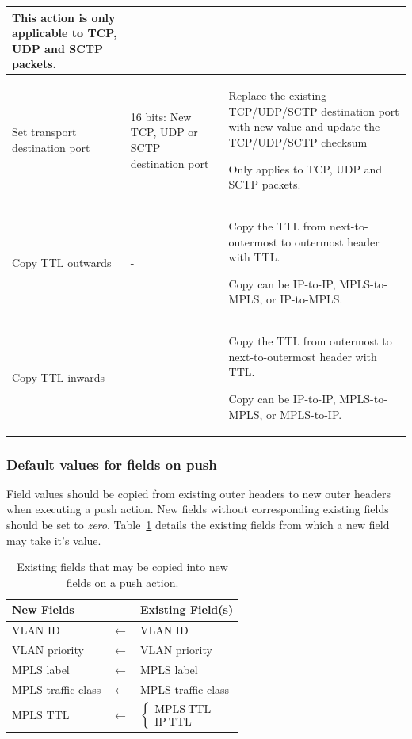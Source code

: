 \documentclass[10pt]{article}
\begin{document}
\begin{xtabular}{ |p{\atactionwidth}|p{\atassocwidth}|p{\atdescwidth}| }
This action is only applicable to TCP, UDP and SCTP packets.\\
\hline
Set transport destination port &
16 bits: New TCP, UDP or SCTP destination port &
Replace the existing TCP/UDP/SCTP destination port with new value and update the TCP/UDP/SCTP checksum

Only applies to TCP, UDP and SCTP packets.\\
\hline
Copy TTL outwards&
- &
Copy the TTL from next-to-outermost to outermost header with TTL.

Copy can be IP-to-IP, MPLS-to-MPLS, or IP-to-MPLS.
\\
\hline
Copy TTL inwards&
- &
Copy the TTL from outermost to next-to-outermost header with TTL.

Copy can be IP-to-IP, MPLS-to-MPLS, or MPLS-to-IP.
\\
\end{xtabular}

\subsubsection{Default values for fields on push}
\label{sec:push field defaults}
Field values should be copied from existing outer headers to new outer headers when executing a push action. New fields without corresponding existing fields should be set to \emph{zero}. Table~\ref{table:push field copy} details the existing fields from which a new field may take it's value.

\begin{table}[hbp]
\centering
\begin{tabular}{lcl}
\textbf{New Fields} & & \textbf{Existing Field(s)} \\
\hline
VLAN ID & $\leftarrow$ & VLAN ID \\
VLAN priority & $\leftarrow$ & VLAN priority \\
MPLS label & $\leftarrow$ & MPLS label \\
MPLS traffic class & $\leftarrow$ & MPLS traffic class \\
MPLS TTL & $\leftarrow$ &
$\left\{
\begin{array}{l}
  \mathrm{MPLS\ TTL} \\ \mathrm{IP\ TTL}
\end{array}
\right.$ \\
\end{tabular}
\caption{Existing fields that may be copied into new fields on a push action.}
\label{table:push field copy}
\end{table}
\end{document}
